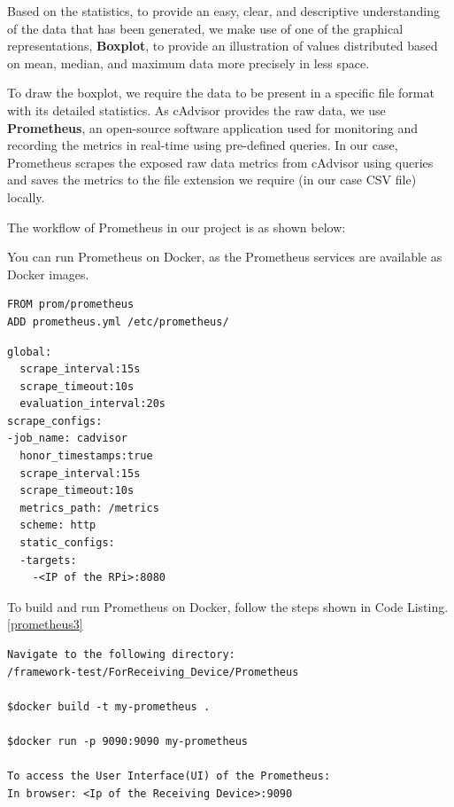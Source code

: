 Based on the statistics, to provide an easy, clear, and descriptive understanding of the data that has been generated, we make use of one of the graphical representations, \textbf{Boxplot}, to provide an illustration of values distributed based on mean, median, and maximum data more precisely in less space. \par

To draw the boxplot, we require the data to be present in a specific file format with its detailed statistics. As cAdvisor provides the raw data, we use \textbf{Prometheus}, an open-source software application used for monitoring and recording the metrics in real-time using pre-defined queries. In our case, Prometheus scrapes the exposed raw data metrics from cAdvisor using queries and saves the metrics to the file extension we require (in our case CSV file) locally. \par

The workflow of Prometheus in our project is as shown below: \par

You can run Prometheus on Docker, as the Prometheus services are available as Docker images.  

\begin{lstlisting}[caption={Dockerfile for Prometheus}, frame=single, label={prometheus1}]
FROM prom/prometheus
ADD prometheus.yml /etc/prometheus/
\end{lstlisting}

\begin{lstlisting}[caption={prometheus.yml file which consists of configuration}, frame=single, label={prometheus2}]
global:
  scrape_interval:15s
  scrape_timeout:10s
  evaluation_interval:20s
scrape_configs:
-job_name: cadvisor
  honor_timestamps:true
  scrape_interval:15s
  scrape_timeout:10s
  metrics_path: /metrics
  scheme: http
  static_configs:
  -targets:
    -<IP of the RPi>:8080
\end{lstlisting}

To build and run Prometheus on Docker, follow the steps shown in Code Listing. \ref{prometheus3}
\begin{lstlisting}[caption={Commands to build and run Prometheus on Docker}, frame=single, label={prometheus3}]
Navigate to the following directory:
/framework-test/ForReceiving_Device/Prometheus

$docker build -t my-prometheus .

$docker run -p 9090:9090 my-prometheus

To access the User Interface(UI) of the Prometheus:
In browser: <Ip of the Receiving Device>:9090
\end{lstlisting}

